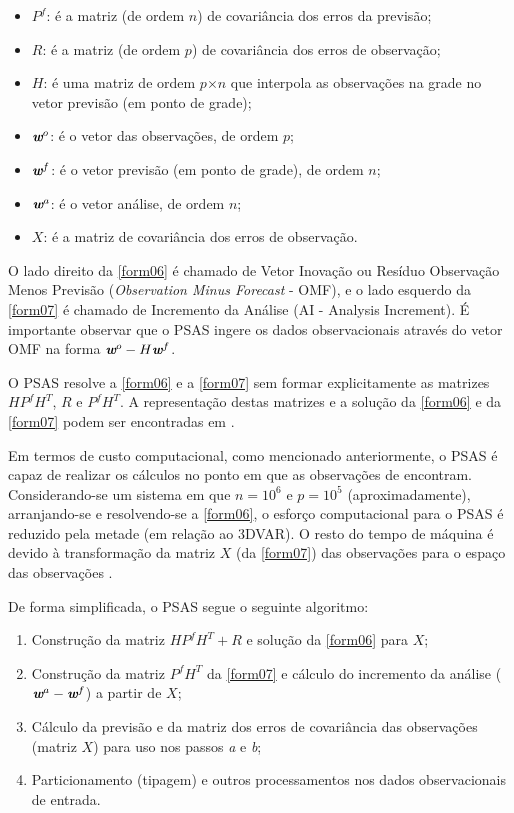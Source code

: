 \begin{itemize}
\item $P^{f}$: é a matriz (de ordem $n$) de covariância dos erros da previsão;
\item $R$: é a matriz (de ordem $p$) de covariância dos erros de observação;
\item $H$: é uma matriz de ordem $p$$\times$$n$ que interpola as observações na grade no vetor previsão (em ponto de grade);
\item $\textit{\textbf{w}}^o$: é o vetor das observações, de ordem $p$;
\item $\textit{\textbf{w}}^f$: é o vetor previsão (em ponto de grade), de ordem $n$;
\item $\textit{\textbf{w}}^a$: é o vetor análise, de ordem $n$;
\item $\textit{X}$: é a matriz de covariância dos erros de observação.
\end{itemize}

O lado direito da \autoref{form06} é chamado de Vetor Inovação ou Resíduo Observação Menos Previsão (\textit{Observation Minus Forecast} - OMF), e o lado esquerdo da \autoref{form07} é chamado de Incremento da Análise (AI - Analysis Increment). É importante observar que o PSAS ingere os dados observacionais através do vetor OMF na forma $\textit{\textbf{w}}^o-H\textit{\textbf{w}}^f$.

O PSAS resolve a \autoref{form06} e a \autoref{form07} sem formar explicitamente as matrizes $HP^{f}H^{T}$, $R$ e $P^{f}H^{T}$. A representação destas matrizes e a solução da \autoref{form06} e da \autoref{form07} podem ser encontradas em .

Em termos de custo computacional, como mencionado anteriormente, o PSAS é capaz de realizar os cálculos no ponto em que as observações de encontram. Considerando-se um sistema em que $n=10^{6}$ e $p=10^{5}$ (aproximadamente), arranjando-se e resolvendo-se a \autoref{form06}, o esforço computacional para o PSAS é reduzido pela metade (em relação ao 3DVAR). O resto do tempo de máquina é devido à transformação da matriz $X$ (da \autoref{form07}) das observações para o espaço das observações \cite{cohnetal98}.

De forma simplificada, o PSAS segue o seguinte algoritmo:

\begin{enumerate}
\item Construção da matriz $HP^{f}H^{T}+R$ e solução da \autoref{form06} para $X$;
\item Construção da matriz $P^{f}H^{T}$ da \autoref{form07} e cálculo do incremento da análise ($\textit{\textbf{w}}^a-\textit{\textbf{w}}^f$) a partir de $X$;
\item Cálculo da previsão e da matriz dos erros de covariância das observações (matriz $X$) para uso nos passos \textit{a} e \textit{b};
\item Particionamento (tipagem) e outros processamentos nos dados observacionais de entrada.
\end{enumerate}

